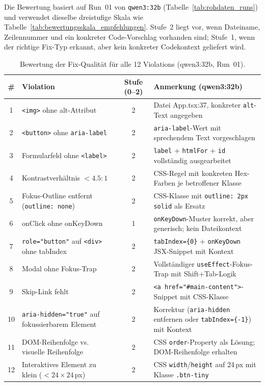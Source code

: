 \clearpage

\label{app:empfehlungsqualitaet_12}

Die Bewertung basiert auf Run~01 von \texttt{qwen3:32b} (Tabelle~\ref{tab:rohdaten_runs}) und verwendet dieselbe dreistufige Skala wie Tabelle~\ref{tab:bewertungsskala_empfehlungen}. Stufe~2 liegt vor, wenn Dateiname, Zeilennummer und ein konkreter Code-Vorschlag vorhanden sind; Stufe~1, wenn der richtige Fix-Typ erkannt, aber kein konkreter Codekontext geliefert wird.

\begin{table}[htbp]
\centering
\setlength{\tabcolsep}{3.5pt}
\renewcommand{\arraystretch}{1.2}
\caption[Bewertung der Empfehlungsqualität pro Violation (test-12)]{Bewertung der Fix-Qualität für alle 12 Violations (qwen3:32b, Run~01).}
\begin{tabular}{|c|p{4.8cm}|c|p{5.2cm}|}
\hline
\textbf{\#} & \textbf{Violation} & \textbf{Stufe (0--2)} & \textbf{Anmerkung (qwen3:32b)} \\
\hline
1 & \texttt{<img>} ohne alt-Attribut & 2 & Datei App.tsx:37, konkreter \texttt{alt}-Text angegeben \\
\hline
2 & \texttt{<button>} ohne \texttt{aria-label} & 2 & \texttt{aria-label}-Wert mit sprechendem Text vorgeschlagen \\
\hline
3 & Formularfeld ohne \texttt{<label>} & 2 & \texttt{label} + \texttt{htmlFor} + \texttt{id} vollständig ausgearbeitet \\
\hline
4 & Kontrastverhältnis $< 4.5:1$ & 2 & CSS-Regel mit konkreten Hex-Farben je betroffener Klasse \\
\hline
5 & Fokus-Outline entfernt (\texttt{outline: none}) & 2 & CSS-Klasse mit \texttt{outline: 2px solid} als Ersatz \\
\hline
6 & onClick ohne onKeyDown & 1 & \texttt{onKeyDown}-Muster korrekt, aber generisch; kein Dateikontext \\
\hline
7 & \texttt{role="button"} auf \texttt{<div>} ohne tabIndex & 2 & \texttt{tabIndex=\{0\}} + \texttt{onKeyDown} JSX-Snippet mit Kontext \\
\hline
8 & Modal ohne Fokus-Trap & 2 & Vollständiger \texttt{useEffect}-Fokus-Trap mit Shift+Tab-Logik \\
\hline
9 & Skip-Link fehlt & 2 & \texttt{<a href="\#main-content">}-Snippet mit CSS-Klasse \\
\hline
10 & \texttt{aria-hidden="true"} auf fokussierbarem Element & 2 & Korrektur (\texttt{aria-hidden} entfernen oder \texttt{tabIndex=\{-1\}}) mit Kontext \\
\hline
11 & DOM-Reihenfolge vs. visuelle Reihenfolge & 2 & CSS \texttt{order}-Property als Lösung; DOM-Reihenfolge erhalten \\
\hline
12 & Interaktives Element zu klein ($<24\times24$\,px) & 2 & CSS \texttt{width}/\texttt{height} auf 24\,px mit Klasse \texttt{.btn-tiny} \\
\hline
\end{tabular}
\label{tab:empfehlungsqualitaet}
\end{table}

